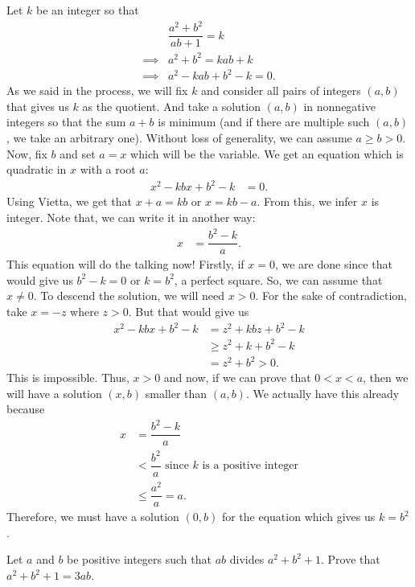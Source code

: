 \documentclass{subfile}
\begin{document}
	\begin{solution}
		Let $k$ be an integer so that
			\begin{align*}
				&\dfrac{a^2+b^2}{ab+1} = k \\
				 \implies & a^2+b^2 = kab+k\\
				\implies  & a^2-kab+b^2-k = 0.
			\end{align*}
		As we said in the process, we will fix $k$ and consider all pairs of integers $(a,b)$ that gives us $k$ as the quotient. And take a solution $(a,b)$ in nonnegative integers so that the sum $a+b$ is minimum (and if there are multiple such $(a,b)$, we take an arbitrary one). Without loss of generality, we can assume $a\geq b>0$. Now, fix $b$ and set $a=x$ which will be the variable. We get an equation which is quadratic in $x$ with a root $a$:
			\begin{align*}
				x^2-kbx+b^2-k & = 0.
			\end{align*}
		Using Vietta, we get that $x+a=kb$ or $x=kb-a$. From this, we infer $x$ is integer. Note that, we can write it in another way:
			\begin{align*}
				x & = \dfrac{b^2-k}{a}.
			\end{align*}
		This equation will do the talking now! Firstly, if $x=0$, we are done since that would give us $b^2-k=0$ or $k=b^2$, a perfect square. So, we can assume that $x\neq0$. To descend the solution, we will need $x>0$. For the sake of contradiction, take $x=-z$ where $z>0$. But that would give us
			\begin{align*}
				x^2-kbx+b^2-k & = z^2+kbz+b^2-k\\
							  &\geq z^2+k+b^2-k\\
							  & = z^2+b^2> 0.
			\end{align*}
		This is impossible. Thus, $x>0$ and now, if we can prove that $0<x<a$, then we will have a solution $(x,b)$ smaller than $(a,b)$. We actually have this already because
			\begin{align*}
				x & = \dfrac{b^2-k}{a}\\
				  & < \dfrac{b^2}{a}\text { since } k\text { is a positive integer}\\
				  &\leq\dfrac{a^2}{a} = a.
			\end{align*}
		Therefore, we must have a solution $(0,b)$ for the equation which gives us $k=b^2$.
	\end{solution}
	
	\begin{problem}
		Let $a$ and $b$ be positive integers such that $ab$ divides $a^2 + b^2 + 1$. Prove that $a^2 + b^2 + 1=3ab$.
	\end{problem}
	
\end{document}
